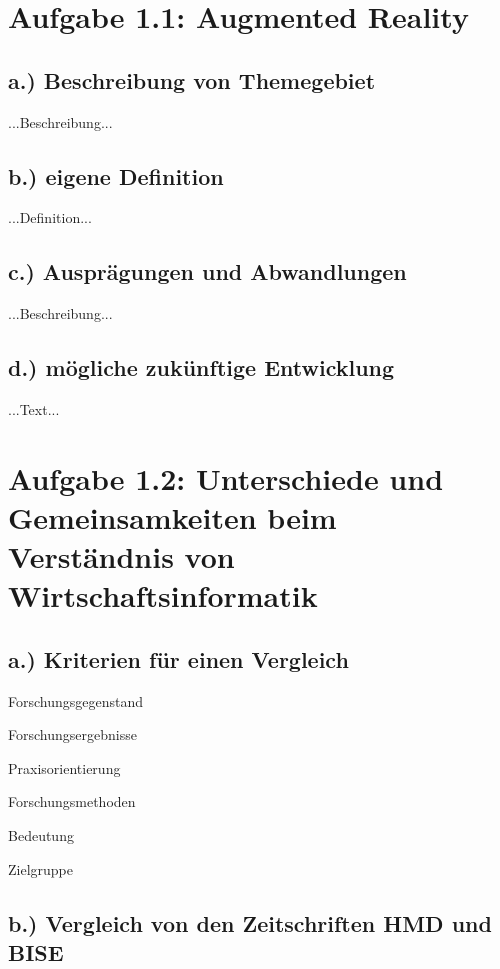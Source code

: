 \documentclass[12pt,utf8]{scrartcl}
\begin{document}
\thispagestyle{empty}
\tableofcontents
\newpage
\begin{flushleft}
\setcounter{page}{1}


\section{\label{sec:thema}Aufgabe 1.1: Augmented Reality}
\subsection{\label{sub:thema}a.) Beschreibung von Themegebiet}

...Beschreibung...

\subsection{\label{sub2:thema}b.) eigene Definition}

...Definition...

\subsection{\label{sub3:thema}c.) Ausprägungen und Abwandlungen}

...Beschreibung...

\subsection{\label{sub4:thema}d.) mögliche zukünftige Entwicklung}

...Text...


\section{\label{sec:einfuehrung}Aufgabe 1.2: Unterschiede und Gemeinsamkeiten beim Verständnis von Wirtschaftsinformatik}
\subsection{\label{sub:einfuehrung}a.) Kriterien für einen Vergleich}

Forschungsgegenstand

Forschungsergebnisse

Praxisorientierung

Forschungsmethoden

Bedeutung

Zielgruppe
\newpage
\subsection{\label{sub2:einfuehrung}b.) Vergleich von den Zeitschriften HMD und BISE}


\end{flushleft}
\end{document}
